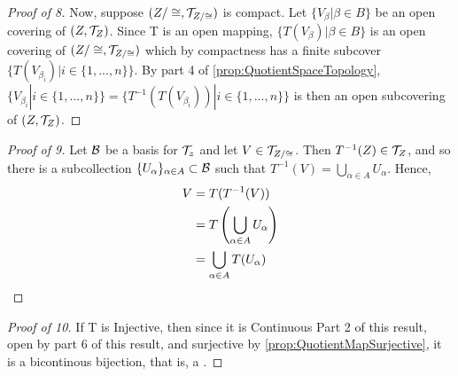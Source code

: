 \begin{prop}
\begin{proof}[Proof of 8]
         
         Now, suppose $(Z/\cong, \mathcal{T}_{Z/\cong})$ is compact. 
         Let $\{V_{\beta} | \beta \in B\}$ be an open covering of $(Z, \mathcal{T}_Z)$. 
         Since T is an open mapping, $\{T(V_{\beta}) | \beta \in B\}$ is an open covering of $(Z/\cong, \mathcal{T}_{Z/\cong})$ which by compactness has a finite subcover $\{T(V_{\beta_i}) | i \in \{1, ..., n\}\}$. 
         By part 4 of \ref{prop:QuotientSpaceTopology}, 
         $\{V_{\beta_i}| i \in \{1, ..., n\}\} = \{T^{-1}(T(V_{\beta_i})) |i \in \{1, ..., n\}\}$ is then an open subcovering of $(Z, \mathcal{T}_Z)$. 
    \end{proof}
    \begin{proof}[Proof of 9]
        Let $\mathcal{B}$ be a basis for $\mathcal{T}_z$ and let $V \in \mathcal{T}_{Z/\cong}$. 
        Then $T^{-1}(Z) \in \mathcal{T}_Z$, and so there is a subcollection $\{U_{\alpha}\}_{\alpha \in A} \subset \mathcal{B}$ such that $T^{-1}(V) = \bigcup_{\alpha \in A} U_{\alpha}$. 
        Hence, 
        \begin{align*}
            V& =T(T^{-1}(V))\\
            & = T\left( \bigcup_{\alpha \in A} U_{\alpha}\right)\\
            & = \bigcup_{\alpha \in A} T(U_{\alpha})
        \end{align*}
     \end{proof} 
     \begin{proof} [Proof of 10]
            If T is Injective, then since it is Continuous Part 2 of this result, open by part 6 of this result, and surjective by \ref{prop:QuotientMapSurjective}, it is a bicontinous bijection, that is, a \Homeomorphism. 
         \end{proof}
\end{prop} 
